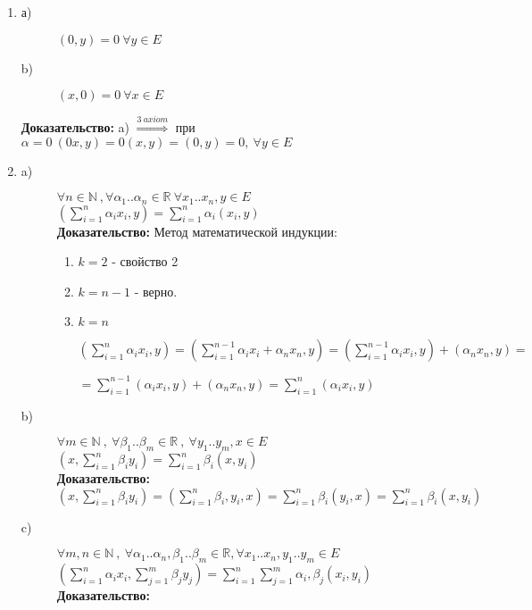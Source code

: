   \begin{enumerate}
   \item \begin{description}
          \item [а)] $(0,y)=0 \ \forall y \in E\ $
          \item [b)] $(x,0)=0 \ \forall x \in E\ $
         \end{description}
         \textbf{Доказательство:} 
         a) $\stackrel {3 \  axiom}{\Rightarrow}$ при $\alpha = 0 \ (0x,y)=0(x,y)=(0,y)=0, \ \forall y \in E\ $
   \item \begin{description}
          \item [a)] $\forall n \in \mathbb{N}\ , \forall \alpha_1..\alpha_n \in \mathbb{R}\ \forall x_1..x_n,y \in E\ $ \\
	  	$\left( \sum \limits_{i=1}^n {\alpha_i x_i},y \right) = \sum \limits_{i=1}^{n} {\alpha_i \left( x_i,y \right)} $ \\
	  	\textbf{Доказательство: } Метод математической индукции:
	  	\begin{enumerate}
	  	      \item $k=2$ - свойство 2
	  	      \item $k=n-1$ - верно.
	  	      \item $k=n$
	  	      
	  	      $\left( \sum \limits_{i=1}^n {\alpha_i x_i},y \right) = \left( \sum \limits_{i=1}^{n-1} {\alpha_i x_i} + \alpha_n x_n,y \right) = 
	  	      \left( \sum \limits_{i=1}^{n-1} {\alpha_i x_i},y\right) + \left(\alpha_n x_n,y \right) = $
	  	      
	  	      $= \sum \limits_{i=1}^{n-1} \left(\alpha_i x_i,y\right) + \left(\alpha_n x_n,y \right) =
	  	      \sum \limits_{i=1}^n \left(\alpha_i x_i,y\right)$
	  	\end{enumerate}

	  \item [b)] $\forall m \in \mathbb{N}\ , \ \forall \beta_1..\beta_m \in \mathbb{R}\ , \ \forall y_1..y_m,x \in E\ $ \\
		$\left( x,\sum \limits_{i=1}^{n} {\beta_iy_i} \right) = \sum \limits_{i=1}^n {\beta_i \left( x,y_i \right)} $ \\
		\textbf{Доказательство: } 
		$ \left( x,\sum \limits_{i=1}^{n} {\beta_iy_i} \right) = \left(\sum \limits_{i=1}^{n} {\beta_i,y_i}, x\right) = \sum \limits_{i=1}^{n} \beta_i \left(y_i,x\right) = \sum \limits_{i=1}^{n} \beta_i \left(x,y_i\right)$
          \item [c)] $\forall m,n \in \mathbb{N}\ , \ \forall \alpha_1..\alpha_n,\beta_1..\beta_m \in \mathbb{R}, \forall x_1..x_n,y_1..y_m \in E\ $ \\
		$\left( \sum \limits_{i=1}^n {\alpha_ix_i} , \sum \limits_{j=1}^m {\beta_jy_j} \right) = 
		\sum \limits_{i=1}^n \sum \limits_{j=1}^m {\alpha_i,\beta_j \left( x_i,y_i \right)} $ \\
		\textbf{Доказательство: } 
		

\end{description}
\end{enumerate}
